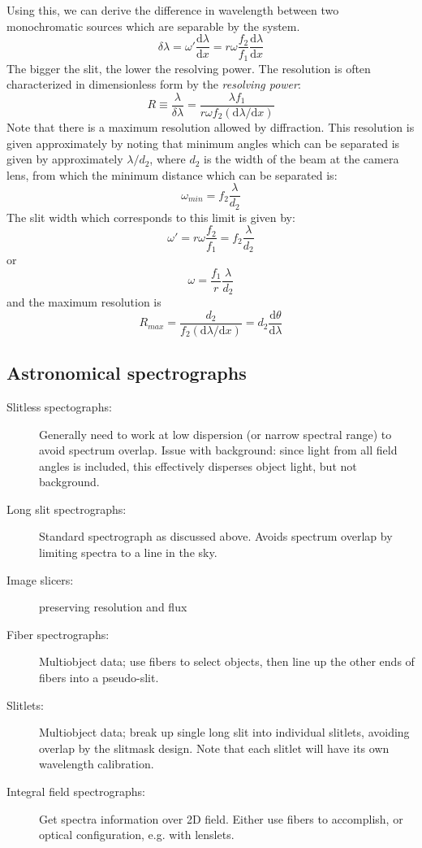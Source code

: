 \documentclass[12pt]{article}
\begin{document}
Using this, we can derive the difference in wavelength between two
monochromatic sources which are separable by the system.
\[
    \delta\lambda
    = \omega'\frac{\textrm{d}\lambda}{\textrm{d}x}
    = r\omega\frac{f_{2}}{f_{1}}\frac{\textrm{d}\lambda}{\textrm{d}x}
    \]
The bigger the slit, the lower the resolving power.
The resolution is often characterized in dimensionless form by
the \textit{resolving power}:
\[
    R \equiv \frac{\lambda}{\delta\lambda} =
    \frac{\lambda{f_{1}}}{r\omega{f_{2}}\left(
    \textrm{d}\lambda/\textrm{d}x\right)}
        \]
Note that there is a maximum resolution allowed by diffraction. This resolution
is given approximately by noting that minimum angles which can be separated is
given by approximately $\lambda/d_{2}$, where $d_{2}$ is the width of the beam
at the camera lens, from which the minimum distance which can be separated is:
\[
    \omega_{min} = f_{2}\frac{\lambda}{d_{2}}
    \]
The slit width which corresponds to this limit is given by:
\[
    \omega' = r\omega\frac{f_{2}}{f_{1}} = f_{2}\frac{\lambda}{d_{2}}
    \]
or
\[
    \omega = \frac{f_{1}}{r}\frac{\lambda}{d_{2}}
    \]
and the maximum resolution is
\[
    R_{max} =
    \frac{d_{2}}{f_{2}\left(\mathrm{d}\lambda/\mathrm{d}x\right)} =
    d_{2}\frac{\mathrm{d}\theta}{\mathrm{d}\lambda}
    \]
\subsection{Astronomical spectrographs}
\begin{description}
    \item [Slitless spectographs:]
        Generally need to work at low dispersion (or narrow spectral range)
        to avoid spectrum overlap. Issue with background: since light from
        all field angles is included, this effectively disperses object
        light, but not background.
    \item [Long slit spectrographs:] Standard spectrograph as discussed above.
        Avoids spectrum overlap by limiting spectra to a line in the sky.
    \item [Image slicers:] preserving resolution and flux
    \item [Fiber spectrographs:] Multiobject data; use fibers to select
        objects, then line up the other ends of fibers into a pseudo-slit.
    \item [Slitlets:] Multiobject data; break up single long slit into
        individual slitlets, avoiding overlap by the slitmask design. Note
        that each slitlet will have its own wavelength calibration.
    \item [Integral field spectrographs:] Get spectra information over 2D
        field. Either use fibers to accomplish, or optical configuration,
        e.g. with lenslets.
\end{description}
\end{document}
